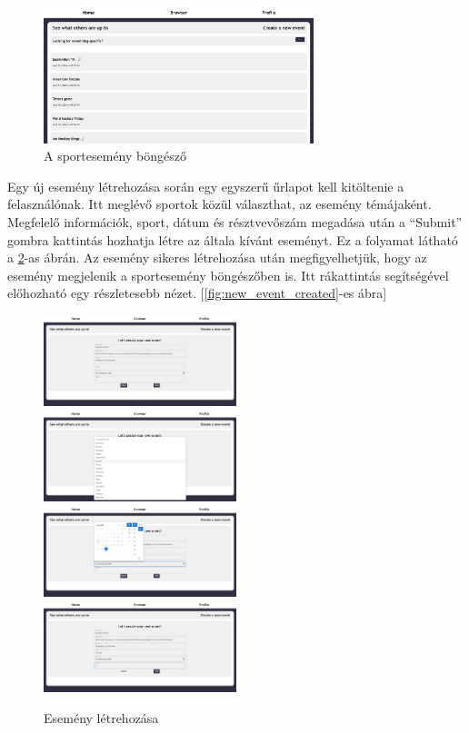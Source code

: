 \begin{figure}[ht]
	\centering
	\includegraphics[width=0.7\textwidth]{images/browser_page.png}
	\caption{A sportesemény böngésző}
	\label{fig:browser_page}
\end{figure}

Egy új esemény létrehozása során egy egyszerű űrlapot kell kitöltenie a felasználónak. Itt meglévő sportok közül választhat, az esemény témájaként.
Megfelelő információk, sport, dátum és résztvevőszám megadása után a ``Submit'' gombra kattintás hozhatja létre az általa kívánt eseményt.
Ez a folyamat látható a \ref{fig:create_event}-as ábrán. Az esemény sikeres létrehozása után megfigyelhetjük, hogy az esemény megjelenik a sportesemény böngészőben is. Itt rákattintás segítségével előhozható
egy részletesebb nézet. [\ref{fig:new_event_created}-es ábra]

\begin{figure}[h]
	\includegraphics[width=0.5\textwidth]{images/create_event_1.png}
	\includegraphics[width=0.5\textwidth]{images/create_event_2.png}
	\includegraphics[width=0.5\textwidth]{images/create_event_3.png}
	\includegraphics[width=0.5\textwidth]{images/create_event_4.png}
	\caption{Esemény létrehozása}
	\label{fig:create_event}
\end{figure}

